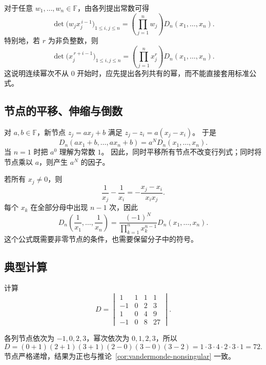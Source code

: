 \documentclass[UTF8,12pt,a4paper,fontset=fandol]{ctexart}
\begin{document}
对于任意 $w_1,\ldots,w_n\in\mathbb F$，由各列提出常数可得
\begin{equation}
  \det\bigl(w_jx_j^{\,i-1}\bigr)_{1\leq i,j\leq n}
  =\left(\prod_{j=1}^n w_j\right)D_n(x_1,\ldots,x_n).
  \label{eq:column-weights}
\end{equation}
特别地，若 $r$ 为非负整数，则
\begin{equation}
  \det\bigl(x_j^{\,r+i-1}\bigr)_{1\leq i,j\leq n}
  =\left(\prod_{j=1}^n x_j^r\right)D_n(x_1,\ldots,x_n).
  \label{eq:shifted-powers}
\end{equation}
这说明连续幂次不从 $0$ 开始时，应先提出各列共有的幂，而不能直接套用标准公式。

\subsection{节点的平移、伸缩与倒数}

对 $a,b\in\mathbb F$，新节点 $z_j=ax_j+b$ 满足 $z_j-z_i=a(x_j-x_i)$。
于是
\begin{equation}
  D_n(ax_1+b,\ldots,ax_n+b)=a^N D_n(x_1,\ldots,x_n).
  \label{eq:affine-nodes}
\end{equation}
当 $n=1$ 时把 $a^0$ 理解为常数 $1$。
因此，同时平移所有节点不改变行列式；同时将节点乘以 $a$，则产生 $a^N$ 的因子。

若所有 $x_j\ne0$，则
\[
  \frac1{x_j}-\frac1{x_i}=-\frac{x_j-x_i}{x_ix_j}.
\]
每个 $x_k$ 在全部分母中出现 $n-1$ 次，因此
\begin{equation}
  D_n\left(\frac1{x_1},\ldots,\frac1{x_n}\right)
  =\frac{(-1)^N}{\prod_{k=1}^n x_k^{n-1}}D_n(x_1,\ldots,x_n).
  \label{eq:reciprocal-nodes}
\end{equation}
这个公式既需要非零节点的条件，也需要保留分子中的符号。

\subsection{典型计算}

\begin{example}[按列顺序计算]
计算
\[
  D=\begin{vmatrix}
    1&1&1&1\\
    -1&0&2&3\\
    1&0&4&9\\
    -1&0&8&27
  \end{vmatrix}.
\]
\end{example}

\begin{solve}
各列节点依次为 $-1,0,2,3$，幂次依次为 $0,1,2,3$，所以
\[
  D=(0+1)(2+1)(3+1)(2-0)(3-0)(3-2)
   =1\cdot3\cdot4\cdot2\cdot3\cdot1=72.
\]
节点严格递增，结果为正也与推论~\ref{cor:vandermonde-nonsingular} 一致。
\end{solve}
\end{document}
